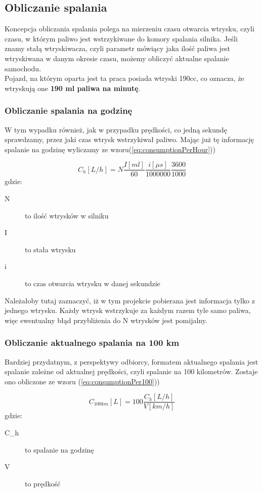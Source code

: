 \subsection{Obliczanie spalania}
Koncepcja obliczania spalania polega na mierzeniu czasu otwarcia wtrysku, czyli czasu, w którym paliwo jest wstrzykiwane do komory spalania silnika. Jeśli znamy stałą wtryskiwacza, czyli parametr mówiący jaka ilość paliwa jest wtryskiwana w danym okresie czasu, możemy obliczyć aktualne spalanie samochodu.\\
Pojazd, na którym oparta jest ta praca posiada wtryski 190cc, co oznacza, że wtryskują one \textbf{190 ml paliwa na minutę}.

\subsubsection{Obliczanie spalania na godzinę}
W tym wypadku również, jak w przypadku prędkości, co jedną sekundę sprawdzamy, przez jaki czas wtrysk wstrzykiwał paliwo. Mając już tę informację spalanie na godzinę wyliczamy ze wzoru(\ref{eq:consumptionPerHour}))

\begin{equation}\label{eq:consumptionPerHour}
C_{h}[L/h] = N\frac{I[ml]}{60}\frac{i[\mu s]}{1000000}\frac{3600}{1000}
\end{equation}
gdzie:
\begin{description}
\item[N] to ilość wtrysków w silniku
\item[I] to stała wtrysku
\item[i] to czas otwarcia wtrysku w danej sekundzie
\end{description}
Należałoby tutaj zaznaczyć, iż w tym projekcie pobierana jest informacja tylko z jednego wtrysku. Każdy wtrysk wstrzykuje za każdym razem tyle samo paliwa, więc ewentualny błąd przybliżenia do N wtrysków jest pomijalny.
\subsubsection{Obliczanie aktualnego spalania na 100 km}
Bardziej przydatnym, z perspektywy odbiorcy, formatem aktualnego spalania jest spalanie zależne od aktualnej prędkości, czyli spalanie na 100 kilometrów. Zostaje ono obliczone ze wzoru (\ref{eq:consumptionPer100}))

\begin{equation}\label{eq:consumptionPer100}
C_{100km}[L] = 100\frac{C_{h}[L/h]}{V[km/h]}
\end{equation}
gdzie:
\begin{description}
\item[C_{h}] to spalanie na godzinę
\item[V] to prędkość
\end{description}\\